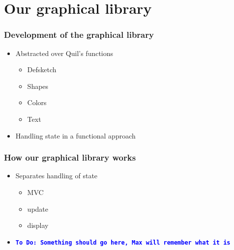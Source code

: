 \documentclass{beamer}
\newcommand{\comment}[1]{{\bf \tt  {#1}}}
\newcommand{\todo}[1]{\textcolor{blue}{\comment{To Do: {#1}}}}
\begin{document}
\section{Our graphical library}

\begin{frame}
\frametitle{Development of the graphical library}
\begin{itemize}
\item Abstracted over Quil's functions
	\begin{itemize}
	\item Defsketch
	\item Shapes
	\item Colors
	\item Text
	\end{itemize}
\item Handling state in a functional approach
\end{itemize}
\end{frame}


\begin{frame}
\frametitle{How our graphical library works}
\begin{itemize}
\item Separates handling of state
	\begin{itemize}
	\item MVC
	\item update
	\item display
	\end{itemize}
\item \todo{Something should go here, Max will remember what it is}
\end{itemize}
\end{frame}
\end{document}
